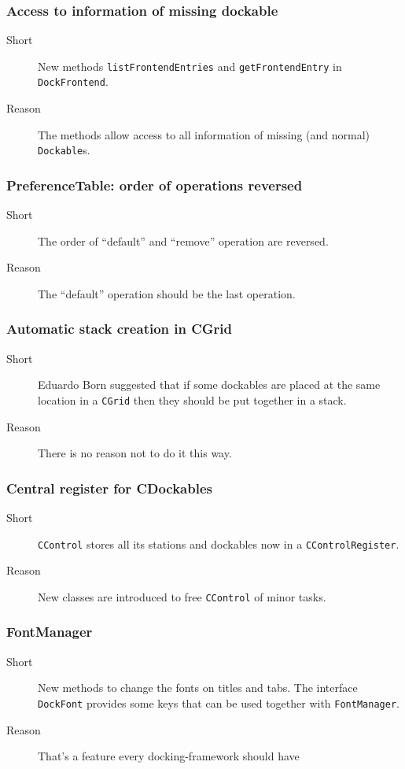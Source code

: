 \documentclass[a4paper,10pt]{article}
\newcommand{\src}[1]{\lstinline[basicstyle=\normalsize\ttfamily,keywordstyle=\normalsize\ttfamily,identifierstyle=\normalsize\ttfamily]|#1|}
\newcommand{\short}{\item[Short]}
\newcommand{\why}{\item[Reason]}
\begin{document}
\subsubsection{Access to information of missing dockable}
\begin{description}
 \short New methods \src{listFrontendEntries} and \src{getFrontendEntry} in \linebreak \src{DockFrontend}.
 \why The methods allow access to all information of missing (and normal) \src{Dockable}s.
\end{description}

\subsubsection{PreferenceTable: order of operations reversed}
\begin{description}
 \short The order of ``default'' and ``remove'' operation are reversed.
 \why The ``default'' operation should be the last operation.
\end{description}

\subsubsection{Automatic stack creation in CGrid}
\begin{description}
 \short Eduardo Born suggested that if some dockables are placed at the same location in a \src{CGrid} then they should be put together in a stack.
 \why There is no reason not to do it this way.
\end{description}

\subsubsection{Central register for CDockables}
\begin{description}
 \short \src{CControl} stores all its stations and dockables now in a \linebreak \src{CControlRegister}.
 \why New classes are introduced to free \src{CControl} of minor tasks.
\end{description}

\subsubsection{FontManager}
\begin{description}
 \short New methods to change the fonts on titles and tabs. The interface \src{DockFont} provides some keys that can be used together with \linebreak \src{FontManager}.
 \why That's a feature every docking-framework should have
\end{description}
\end{document}
